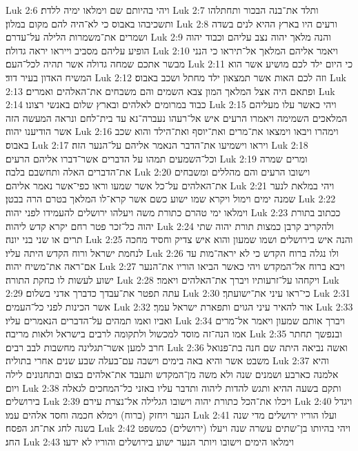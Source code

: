 Luk 2:6  ויהי בהיותם שם וימלאו ימיה ללדת׃
Luk 2:7  ותלד את־בנה הבכור ותחתלהו ותשכיבהו באבוס כי לא־היה להם מקום במלון׃
Luk 2:8  ורעים היו בארץ ההיא לנים בשדה ושמרים את־משמרות הלילה על־עדרם׃
Luk 2:9  והנה מלאך יהוה נצב עליהם וכבוד יהוה הופיע עליהם מסביב וייראו יראה גדולה׃
Luk 2:10  ויאמר אליהם המלאך אל־תיראו כי הנני מבשר אתכם שמחה גדולה אשר תהיה לכל־העם׃
Luk 2:11  כי היום ילד לכם מושיע אשר הוא המשיח האדון בעיר דוד׃
Luk 2:12  וזה לכם האות אשר תמצאון ילד מחתל ושכב באבוס׃
Luk 2:13  ופתאם היה אצל המלאך המון צבא השמים והם משבחים את־האלהים ואמרים׃
Luk 2:14  כבוד במרומים לאלהים ובארץ שלום באנשי רצונו׃
Luk 2:15  ויהי כאשר עלו מעליהם המלאכים השמימה ויאמרו הרעים איש אל־רעהו נעברה־נא עד בית־לחם ונראה המעשה הזה אשר הודיענו יהוה׃
Luk 2:16  וימהרו ויבאו וימצאו את־מרים ואת־יוסף ואת־הילד והוא שכב באבוס׃
Luk 2:17  ויראו וישמיעו את־הדבר הנאמר אליהם על־הנער הזה׃
Luk 2:18  וכל־השמעים תמהו על הדברים אשר־דברו אליהם הרעים׃
Luk 2:19  ומרים שמרה את־הדברים האלה ותחשבם בלבה׃
Luk 2:20  וישובו הרעים והם מהללים ומשבחים את־האלהים על־כל אשר שמעו וראו כפי־אשר נאמר אליהם׃
Luk 2:21  ויהי במלאת לנער שמנה ימים וימול ויקרא שמו ישוע כשם אשר קרא־לו המלאך בטרם הרה בבטן׃
Luk 2:22  וימלאו ימי טהרם כתורת משה ויעלהו ירושלים להעמידו לפני יהוה׃
Luk 2:23  ככתוב בתורת יהוה כל־זכר פטר רחם יקרא קדש ליהוה׃
Luk 2:24  ולהקריב קרבן כמצות תורת יהוה שתי תרים או שני בני יונה׃
Luk 2:25  והנה איש בירושלים ושמו שמעון והוא איש צדיק וחסיד מחכה לנחמת ישראל ורוח הקדש היתה עליו׃
Luk 2:26  ולו נגלה ברוח הקדש כי לא יראה־מות עד אם־ראה את־משיח יהוה׃
Luk 2:27  ויבא ברוח אל־המקדש ויהי כאשר הביאו הוריו את־הנער ישוע לעשות לו כחקת התורה׃
Luk 2:28  ויקחהו על־זרעותיו ויברך את־האלהים ויאמר׃
Luk 2:29  עתה תפטר את־עבדך כדברך אדני בשלום׃
Luk 2:30  כי־ראו עיני את־ישועתך׃
Luk 2:31  אשר הכינות לפני כל־העמים׃
Luk 2:32  אור להאיר עיני הגוים ותפארת ישראל עמך׃
Luk 2:33  ואביו ואמו תמהים על־הדברים הנאמרים עליו׃
Luk 2:34  ויברך אותם שמעון ויאמר אל־מרים אמו הנה־זה מוסד למכשול ולתקומה לרבים בישראל ולאות מריבה׃
Luk 2:35  ובנפשך תחתר חרב למען אשר־תגלינה מחשבות לבב רבים׃
Luk 2:36  ואשה נביאה היתה שם חנה בת־פנואל משבט אשר והיא באה בימים וישבה עם־בעלה שבע שנים אחרי בתוליה׃
Luk 2:37  והיא אלמנה כארבע ושמנים שנה ולא משה מן־המקדש ותעבד את־אלהים בצום ובתחנונים לילה ויום׃
Luk 2:38  ותקם בשעה ההיא ותגש להדות ליהוה ותדבר עליו באזני כל־המחכים לגאלה בירושלים׃
Luk 2:39  ויכלו את־הכל כתורת יהוה וישובו הגלילה אל־נצרת עירם׃
Luk 2:40  ויגדל הנער ויחזק (ברוח) וימלא חכמה וחסד אלהים עמו׃
Luk 2:41  ועלו הוריו ירושלים מדי שנה בשנה לחג את־חג הפסח׃
Luk 2:42  ויהי בהיותו בן־שתים עשרה שנה ויעלו (ירושלים) כמשפט החג׃
Luk 2:43  וימלאו הימים וישובו ויותר הנער ישוע בירושלים והוריו לא ידעו׃
